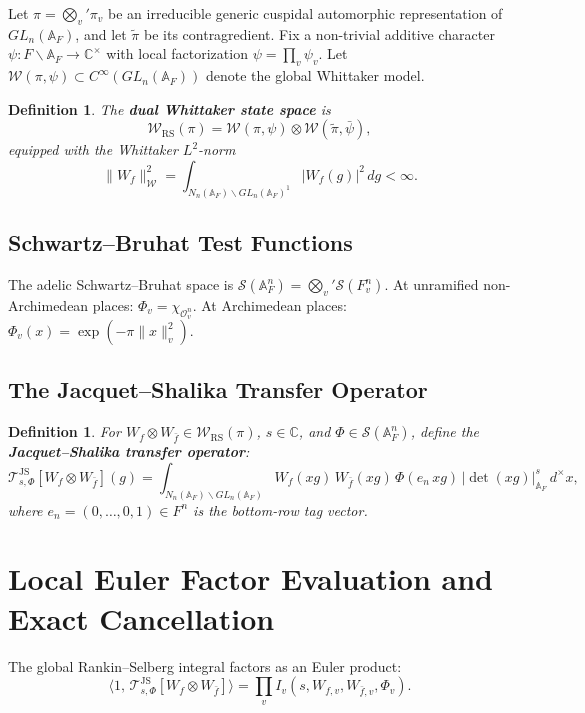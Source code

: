\documentclass[12pt]{article}
\newtheorem{definition}[theorem]{Definition}
\begin{document}
Let $\pi = \bigotimes_v' \pi_v$ be an irreducible generic cuspidal automorphic representation
of $GL_n(\mathbb{A}_F)$, and let $\tilde\pi$ be its contragredient.
Fix a non-trivial additive character $\psi: F \backslash \mathbb{A}_F \to \mathbb{C}^\times$
with local factorization $\psi = \prod_v \psi_v$.
Let $\mathcal{W}(\pi, \psi) \subset C^\infty(GL_n(\mathbb{A}_F))$ denote the global Whittaker model.

\begin{definition}
The \textbf{dual Whittaker state space} is
\[
  \mathcal{W}_{\mathrm{RS}}(\pi) = \mathcal{W}(\pi, \psi) \otimes \mathcal{W}(\tilde\pi, \bar\psi),
\]
equipped with the Whittaker $L^2$-norm
\[
  \|W_f\|_\mathcal{W}^2
  = \int_{N_n(\mathbb{A}_F)\backslash GL_n(\mathbb{A}_F)^1} |W_f(g)|^2\, dg < \infty.
\]
\end{definition}

\subsection{Schwartz--Bruhat Test Functions}

The adelic Schwartz--Bruhat space is $\mathcal{S}(\mathbb{A}_F^n) = \bigotimes_v' \mathcal{S}(F_v^n)$.
At unramified non-Archimedean places: $\Phi_v = \chi_{\mathcal{O}_v^n}$.
At Archimedean places: $\Phi_v(x) = \exp(-\pi\|x\|_v^2)$.

\subsection{The Jacquet--Shalika Transfer Operator}

\begin{definition}
For $W_f \otimes W_{\bar f} \in \mathcal{W}_{\mathrm{RS}}(\pi)$,
$s \in \mathbb{C}$, and $\Phi \in \mathcal{S}(\mathbb{A}_F^n)$, define the
\textbf{Jacquet--Shalika transfer operator}:
\[
  \mathcal{T}_{s,\Phi}^{\mathrm{JS}}[W_f \otimes W_{\bar f}](g)
  = \int_{N_n(\mathbb{A}_F)\backslash GL_n(\mathbb{A}_F)}
    W_f(xg)\, W_{\bar f}(xg)\, \Phi(e_n\, xg)\, |\det(xg)|_{\mathbb{A}_F}^s\, d^\times x,
\]
where $e_n = (0,\ldots,0,1) \in F^n$ is the bottom-row tag vector.
\end{definition}

\section{Local Euler Factor Evaluation and Exact Cancellation}

The global Rankin--Selberg integral factors as an Euler product:
\[
  \langle 1,\, \mathcal{T}_{s,\Phi}^{\mathrm{JS}}[W_f \otimes W_{\bar f}]\rangle
  = \prod_v I_v(s, W_{f,v}, W_{\bar f,v}, \Phi_v).
\]
\end{document}
